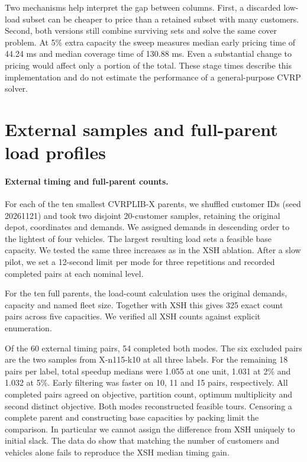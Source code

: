 \documentclass[runningheads]{llncs}
\begin{document}
Two mechanisms help interpret the gap between columns. First, a discarded low-load subset can be cheaper to price than a retained subset with many customers. Second, both versions still combine surviving sets and solve the same cover problem. At 5\% extra capacity the sweep measures median early pricing time of 44.24 ms and median coverage time of 130.88 ms. Even a substantial change to pricing would affect only a portion of the total. These stage times describe this implementation and do not estimate the performance of a general-purpose CVRP solver.

\section{External samples and full-parent load profiles}
\paragraph{External timing and full-parent counts.}
For each of the ten smallest CVRPLIB-X parents, we shuffled customer IDs (seed 20261121) and took two disjoint 20-customer samples, retaining the original depot, coordinates and demands. We assigned demands in descending order to the lightest of four vehicles. The largest resulting load sets a feasible base capacity. We tested the same three increases as in the XSH ablation. After a slow pilot, we set a 12-second limit per mode for three repetitions and recorded completed pairs at each nominal level.

For the ten full parents, the load-count calculation uses the original demands, capacity and named fleet size. Together with XSH this gives 325 exact count pairs across five capacities. We verified all XSH counts against explicit enumeration.


Of the 60 external timing pairs, 54 completed both modes. The six excluded pairs are the two samples from X-n115-k10 at all three labels. For the remaining 18 pairs per label, total speedup medians were 1.055 at one unit, 1.031 at 2\% and 1.032 at 5\%. Early filtering was faster on 10, 11 and 15 pairs, respectively. All completed pairs agreed on objective, partition count, optimum multiplicity and second distinct objective. Both modes reconstructed feasible tours. Censoring a complete parent and constructing base capacities by packing limit the comparison. In particular we cannot assign the difference from XSH uniquely to initial slack. The data do show that matching the number of customers and vehicles alone fails to reproduce the XSH median timing gain.
\end{document}
